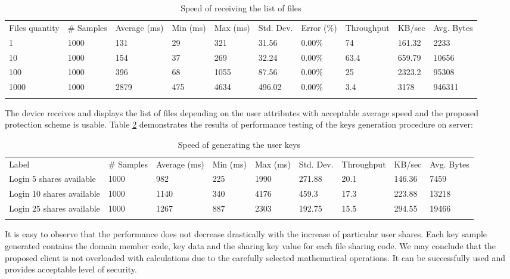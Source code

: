 \documentclass[twocolumn]{svjour3}          	%
\begin{document}
\begin{table}
	\caption{Speed of receiving the list of files}
	\label{tab:02}
	\centering
	\begin{tabular}{l|l|l|l|l|l|l|l|l|l}
		Files quantity 	& \# Samples 	& Average (ms) 	& Min (ms) 	& Max (ms) 	& Std. Dev. 	& Error (\%)		& Throughput 	& KB/sec 	& Avg. Bytes \\
		\noalign{\smallskip}\hline\noalign{\smallskip}
		1		& 1000	& 131	& 29		& 321	& 31.56		& 0.00\%		& 74		& 161.32		& 2233	\\
		10		& 1000	& 154	& 37		& 269	& 32.24		& 0.00\%		& 63.4	& 659.79		& 10656	\\
		100		& 1000	& 396	& 68	 	& 1055	& 87.56		& 0.00\%		& 25		& 2323.2		& 95308	\\
		1000		& 1000	& 2879	& 475	& 4634	& 496.02		& 0.00\%		& 3.4	& 3178		& 946311	\\
		\noalign{\smallskip}\hline
	\end{tabular}
\end{table}

The device receives and displays the list of files depending on the user attributes with acceptable average speed and the proposed protection scheme is usable. Table \ref{tab:03} demonstrates the results of performance testing of the keys generation procedure on server:

\begin{table}
	\caption{Speed of generating the user keys}
	\label{tab:03}
	\centering
	\begin{tabular}{l|l|l|l|l|l|l|l|l}
		Label	& \# Samples	& Average (ms)	& Min (ms)	& Max (ms)	& Std. Dev.	& Throughput		& KB/sec		& Avg. Bytes \\
		\noalign{\smallskip}\hline\noalign{\smallskip}
		Login 5 shares available		& 1000	& 982	& 225	& 1990	& 271.88		& 20.1	& 146.36		& 7459	\\
		Login 10 shares available	& 1000	& 1140	& 340	& 4176	& 459.3		& 17.3	& 223.88		& 13218	\\
		Login 25 shares available	& 1000	& 1267	& 887	& 2303	& 192.75		& 15.5	& 294.55		& 19466 \\
		\noalign{\smallskip}\hline
	\end{tabular}
\end{table}

It is easy to observe that the performance does not decrease drastically with the increase of particular user shares. Each key sample generated contains the domain member code, key data and the sharing key value for each file sharing code. We may conclude that the proposed client is not overloaded with calculations due to the carefully selected mathematical operations. It can be successfully used and provides acceptable level of security.
\end{document}
